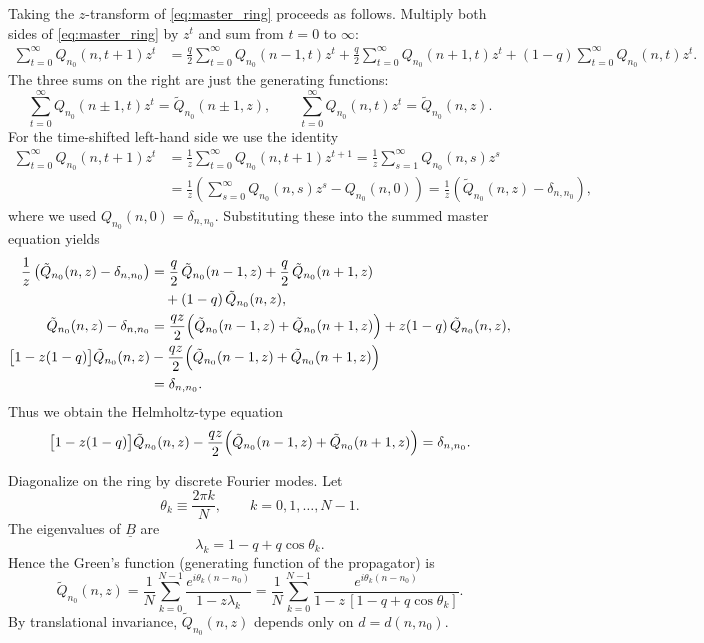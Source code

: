 \documentclass[11pt]{article}
\begin{document}
Taking the $z$-transform of \eqref{eq:master_ring} proceeds as follows.
Multiply both sides of \eqref{eq:master_ring} by $z^t$ and sum from $t=0$ to $\infty$:
\begin{align*}
\sum_{t=0}^{\infty} Q_{n_0}(n,t+1) z^t
&=\frac q2\sum_{t=0}^{\infty} Q_{n_0}(n-1,t) z^t
 +\frac q2\sum_{t=0}^{\infty} Q_{n_0}(n+1,t) z^t
 +(1-q)\sum_{t=0}^{\infty} Q_{n_0}(n,t) z^t.
\end{align*}
The three sums on the right are just the generating functions:
\[
\sum_{t=0}^{\infty} Q_{n_0}(n\pm 1,t) z^t=\tilde Q_{n_0}(n\pm 1,z),
\qquad
\sum_{t=0}^{\infty} Q_{n_0}(n,t) z^t=\tilde Q_{n_0}(n,z).
\]
For the time-shifted left-hand side we use the identity
\begin{align*}
\sum_{t=0}^{\infty} Q_{n_0}(n,t+1) z^t
&=\frac{1}{z}\sum_{t=0}^{\infty} Q_{n_0}(n,t+1) z^{t+1}
=\frac{1}{z}\sum_{s=1}^{\infty} Q_{n_0}(n,s) z^{s}\\
&=\frac{1}{z}\left(\sum_{s=0}^{\infty} Q_{n_0}(n,s) z^{s}-Q_{n_0}(n,0)\right)
=\frac{1}{z}\left(\tilde Q_{n_0}(n,z)-\delta_{n,n_0}\right),
\end{align*}
where we used $Q_{n_0}(n,0)=\delta_{n,n_0}$.
Substituting these into the summed master equation yields
\begin{align*}
\frac{1}{z}\left(\tilde Q_{n_0}(n,z)-\delta_{n,n_0}\right)
&=\frac q2\,\tilde Q_{n_0}(n-1,z)+\frac q2\,\tilde Q_{n_0}(n+1,z)\\
&\quad +(1-q)\,\tilde Q_{n_0}(n,z),\\
\tilde Q_{n_0}(n,z)-\delta_{n,n_0}
&=\frac{qz}{2}\Bigl(\tilde Q_{n_0}(n-1,z)+\tilde Q_{n_0}(n+1,z)\Bigr)+z(1-q)\,\tilde Q_{n_0}(n,z),\\
\bigl[1-z(1-q)\bigr]\tilde Q_{n_0}(n,z)
&-\frac{qz}{2}\Bigl(\tilde Q_{n_0}(n-1,z)+\tilde Q_{n_0}(n+1,z)\Bigr)\\
&=\delta_{n,n_0}.
\end{align*}
Thus we obtain the Helmholtz-type equation
\begin{equation}
\bigl[1-z(1-q)\bigr]\tilde Q_{n_0}(n,z)-\frac{qz}{2}\Bigl(\tilde Q_{n_0}(n-1,z)+\tilde Q_{n_0}(n+1,z)\Bigr)
=\delta_{n,n_0}.
\label{eq:helmholtz_ring}
\end{equation}

Diagonalize on the ring by discrete Fourier modes. Let
\[
\theta_k\equiv \frac{2\pi k}{N},\qquad k=0,1,\dots,N-1.
\]
The eigenvalues of $\underline{B}$ are
\[
\lambda_k=1-q+q\cos\theta_k.
\]
Hence the Green's function (generating function of the propagator) is
\begin{equation}
\tilde Q_{n_0}(n,z)
=\frac{1}{N}\sum_{k=0}^{N-1}\frac{e^{i\theta_k(n-n_0)}}{1-z\lambda_k}
=\frac{1}{N}\sum_{k=0}^{N-1}\frac{e^{i\theta_k(n-n_0)}}{1-z\,[1-q+q\cos\theta_k]}.
\label{eq:Q_fourier}
\end{equation}
By translational invariance, $\tilde Q_{n_0}(n,z)$ depends only on $d=d(n,n_0)$.
\end{document}
